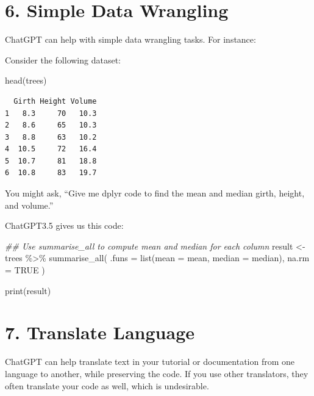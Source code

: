 \documentclass[
  letterpaper,
  DIV=11,
  numbers=noendperiod]{scrreprt}
\newenvironment{Shaded}{\begin{snugshade}}{\end{snugshade}}
\newcommand{\AttributeTok}[1]{\textcolor[rgb]{0.40,0.45,0.13}{#1}}
\newcommand{\ConstantTok}[1]{\textcolor[rgb]{0.56,0.35,0.01}{#1}}
\newcommand{\DocumentationTok}[1]{\textcolor[rgb]{0.37,0.37,0.37}{\textit{#1}}}
\newcommand{\FunctionTok}[1]{\textcolor[rgb]{0.28,0.35,0.67}{#1}}
\newcommand{\NormalTok}[1]{\textcolor[rgb]{0.00,0.23,0.31}{#1}}
\newcommand{\OtherTok}[1]{\textcolor[rgb]{0.00,0.23,0.31}{#1}}
\newcommand{\SpecialCharTok}[1]{\textcolor[rgb]{0.37,0.37,0.37}{#1}}
\begin{document}
\hypertarget{simple-data-wrangling}{%
\section{6. Simple Data Wrangling}\label{simple-data-wrangling}}

ChatGPT can help with simple data wrangling tasks. For instance:

Consider the following dataset:

\begin{Shaded}
\begin{Highlighting}[]
\FunctionTok{head}\NormalTok{(trees)}
\end{Highlighting}
\end{Shaded}

\begin{verbatim}
  Girth Height Volume
1   8.3     70   10.3
2   8.6     65   10.3
3   8.8     63   10.2
4  10.5     72   16.4
5  10.7     81   18.8
6  10.8     83   19.7
\end{verbatim}

You might ask, ``Give me dplyr code to find the mean and median girth,
height, and volume.''

ChatGPT3.5 gives us this code:

\hypertarget{chatgpt}{}
\begin{Shaded}
\begin{Highlighting}[]
\DocumentationTok{\#\# Use summarise\_all to compute mean and median for each column}
\NormalTok{result }\OtherTok{\textless{}{-}}\NormalTok{ trees }\SpecialCharTok{\%\textgreater{}\%}
  \FunctionTok{summarise\_all}\NormalTok{(}
    \AttributeTok{.funs =} \FunctionTok{list}\NormalTok{(}\AttributeTok{mean =}\NormalTok{ mean, }\AttributeTok{median =}\NormalTok{ median),}
    \AttributeTok{na.rm =} \ConstantTok{TRUE}
\NormalTok{  )}

\FunctionTok{print}\NormalTok{(result)}
\end{Highlighting}
\end{Shaded}

\hypertarget{translate-language}{%
\section{7. Translate Language}\label{translate-language}}

ChatGPT can help translate text in your tutorial or documentation from
one language to another, while preserving the code. If you use other
translators, they often translate your code as well, which is
undesirable.
\end{document}
